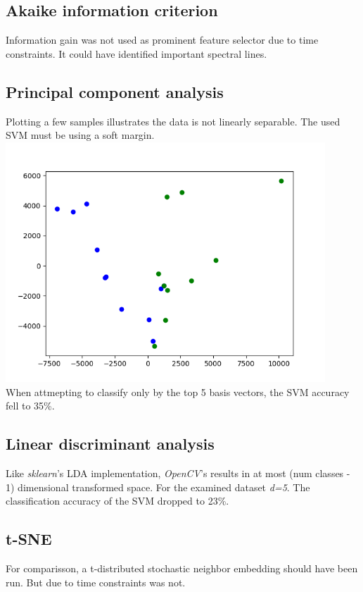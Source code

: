 \documentclass{article}
\begin{document}
\subsection{Akaike information criterion}
Information gain was not used as prominent feature selector due to time constraints.
It could have identified important spectral lines.


\subsection{Principal component analysis}
Plotting a few samples illustrates the data is not linearly separable.
The used SVM must be using a soft margin.
\\
\includegraphics[width=0.9\textwidth]{img/pca}
\\
When attmepting to classify only by the top 5 basis vectors, the SVM accuracy fell to 35\%.


\subsection{Linear discriminant analysis}
Like \textit{sklearn}'s LDA implementation, \textit{OpenCV}'s results in at most (num classes - 1) dimensional transformed space.
For the examined dataset \textit{d=5}.
The classification accuracy of the SVM dropped to 23\%.


\subsection{t-SNE}
For comparisson, a t-distributed stochastic neighbor embedding should have been run.
But due to time constraints was not.
\end{document}
